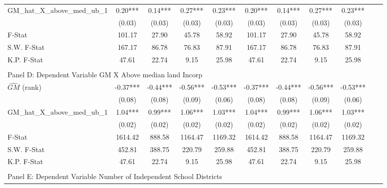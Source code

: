 \begin{table}[htbp]
\begin{threeparttable}
\begin{tabular}{l*{10}{c}}
\addlinespace
GM\_hat\_X\_above\_med\_ub\_1&       0.20***&       0.14***&       0.27***&       0.23***&       0.20***&       0.14***&       0.27***&       0.23***\\
                &     (0.03)   &     (0.03)   &     (0.03)   &     (0.03)   &     (0.03)   &     (0.03)   &     (0.03)   &     (0.03)   \\
\midrule
F-Stat          &     101.17   &      27.90   &      45.78   &      58.92   &     101.17   &      27.90   &      45.78   &      58.92   \\
S.W. F-Stat     &     167.17   &      86.78   &      76.83   &      87.91   &     167.17   &      86.78   &      76.83   &      87.91   \\
K.P. F-Stat     &      47.61   &      22.74   &       9.15   &      25.98   &      47.61   &      22.74   &       9.15   &      25.98   \\
\cmidrule[\heavyrulewidth](lr){1-9} \\ \cmidrule[\heavyrulewidth](lr){1-9}
\multicolumn{8}{l}{Panel D: Dependent Variable GM X Above median land Incorp}\\
\cmidrule(lr){1-9}
$\hat{GM}$ (rank)&      -0.37***&      -0.44***&      -0.56***&      -0.53***&      -0.37***&      -0.44***&      -0.56***&      -0.53***\\
                &     (0.08)   &     (0.08)   &     (0.09)   &     (0.06)   &     (0.08)   &     (0.08)   &     (0.09)   &     (0.06)   \\
\addlinespace
GM\_hat\_X\_above\_med\_ub\_1&       1.04***&       0.99***&       1.06***&       1.03***&       1.04***&       0.99***&       1.06***&       1.03***\\
                &     (0.02)   &     (0.02)   &     (0.02)   &     (0.02)   &     (0.02)   &     (0.02)   &     (0.02)   &     (0.02)   \\
\midrule
F-Stat          &    1614.42   &     888.58   &    1164.47   &    1169.32   &    1614.42   &     888.58   &    1164.47   &    1169.32   \\
S.W. F-Stat     &     452.81   &     388.75   &     220.79   &     259.88   &     452.81   &     388.75   &     220.79   &     259.88   \\
K.P. F-Stat     &      47.61   &      22.74   &       9.15   &      25.98   &      47.61   &      22.74   &       9.15   &      25.98   \\
\cmidrule[\heavyrulewidth](lr){1-9} \\ \cmidrule[\heavyrulewidth](lr){1-9}
\multicolumn{8}{l}{Panel E: Dependent Variable Number of Independent School Districts}\\

\end{tabular}
\end{threeparttable}
\end{table}
